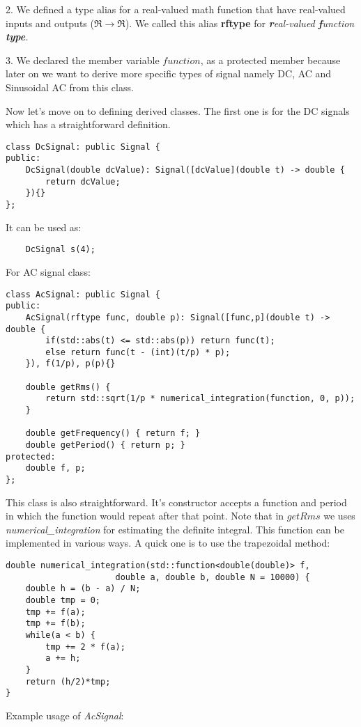 \documentclass{article}
\begin{document}
	2. We defined a type alias for a real-valued math function that have real-valued inputs and outputs ($\Re\rightarrow\Re$). We called this alias \textbf{rftype} for \textit{\textbf{r}eal-valued \textbf{f}unction \textbf{type}.}
	
	3. We declared the member variable $function$, as a protected member because later on we want to derive more specific types of signal namely DC, AC and Sinusoidal AC from this class.
	 
	Now let's move on to defining derived classes. The first one is for the DC signals which has a straightforward definition.
	
	\begin{verbatim}
class DcSignal: public Signal {
public:
    DcSignal(double dcValue): Signal([dcValue](double t) -> double {
        return dcValue;
    }){}
};
	\end{verbatim}
	
	It can be used as:
	
	\begin{verbatim}
	DcSignal s(4);
	\end{verbatim}
	
	For AC signal class:
	\begin{verbatim}
class AcSignal: public Signal {
public:
    AcSignal(rftype func, double p): Signal([func,p](double t) -> double {
        if(std::abs(t) <= std::abs(p)) return func(t);
        else return func(t - (int)(t/p) * p);
    }), f(1/p), p(p){}
		
    double getRms() {
        return std::sqrt(1/p * numerical_integration(function, 0, p));
    }
		
    double getFrequency() { return f; }
    double getPeriod() { return p; }
protected:
    double f, p;
};
	\end{verbatim}

	This class is also straightforward. It's constructor accepts a function and period in which the function would repeat after that point.
	Note that in $getRms$ we uses \textit{numerical\_integration} for estimating the definite integral. This function can be implemented in various ways. A quick one is to use the trapezoidal method:
	
	\begin{verbatim}
double numerical_integration(std::function<double(double)> f,
                      double a, double b, double N = 10000) {
    double h = (b - a) / N;
    double tmp = 0;
    tmp += f(a);
    tmp += f(b);
    while(a < b) {
        tmp += 2 * f(a);
        a += h;
    }
    return (h/2)*tmp;
}
	\end{verbatim}
	Example usage of \textit{AcSignal}:
	
\end{document}
